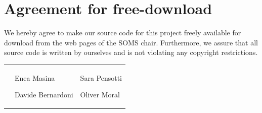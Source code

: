 \documentclass[11pt,a4paper,parskip=half-]{article}
\begin{document}
                



\newpage


\newpage
\section*{Agreement for free-download}
\bigskip


\bigskip


\large We hereby agree to make our source code for this project freely available for download from the web pages of the SOMS chair. Furthermore, we assure that all source code is written by ourselves and is not violating any copyright restrictions.

\begin{center}

\bigskip


\bigskip


\begin{tabular}{@{}p{3.3cm}@{}p{6cm}@{}@{}p{6cm}@{}}
\begin{minipage}{3cm}

\end{minipage}
&
\begin{minipage}{6cm}
\vspace{5mm} \large Enea Masina


\vspace{30mm} \large Davide Bernardoni

 \vspace{\baselineskip}

\end{minipage}
&
\begin{minipage}{10cm} \large Sara Pensotti

\vspace{30mm} \large Oliver Moral


\end{minipage}
\end{tabular}


\end{center}
\newpage


\clearpage\null\newpage





\newpage




\tableofcontents
\end{document}
